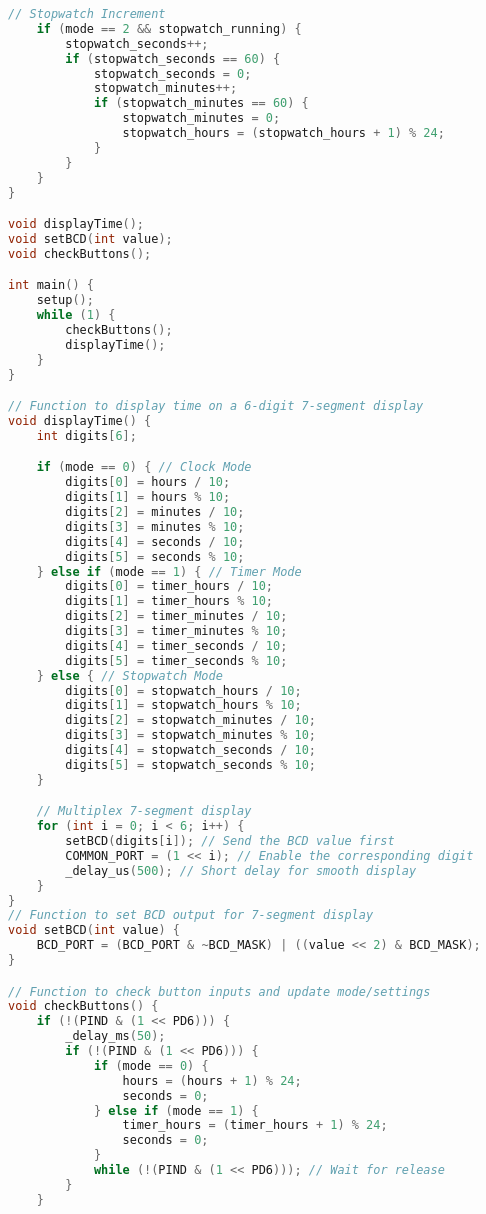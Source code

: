 \documentclass[a4paper,12pt]{article}
\begin{document}
\begin{lstlisting}[language=C++, caption=Arduino Code for Digital Clock]
    // Stopwatch Increment
    if (mode == 2 && stopwatch_running) {
        stopwatch_seconds++;
        if (stopwatch_seconds == 60) {
            stopwatch_seconds = 0;
            stopwatch_minutes++;
            if (stopwatch_minutes == 60) {
                stopwatch_minutes = 0;
                stopwatch_hours = (stopwatch_hours + 1) % 24;
            }
        }
    }
}

void displayTime();
void setBCD(int value);
void checkButtons();

int main() {
    setup();
    while (1) {
        checkButtons();
        displayTime();
    }
}

// Function to display time on a 6-digit 7-segment display
void displayTime() {
    int digits[6];

    if (mode == 0) { // Clock Mode
        digits[0] = hours / 10;
        digits[1] = hours % 10;
        digits[2] = minutes / 10;
        digits[3] = minutes % 10;
        digits[4] = seconds / 10;
        digits[5] = seconds % 10;
    } else if (mode == 1) { // Timer Mode
        digits[0] = timer_hours / 10;
        digits[1] = timer_hours % 10;
        digits[2] = timer_minutes / 10;
        digits[3] = timer_minutes % 10;
        digits[4] = timer_seconds / 10;
        digits[5] = timer_seconds % 10;
    } else { // Stopwatch Mode
        digits[0] = stopwatch_hours / 10;
        digits[1] = stopwatch_hours % 10;
        digits[2] = stopwatch_minutes / 10;
        digits[3] = stopwatch_minutes % 10;
        digits[4] = stopwatch_seconds / 10;
        digits[5] = stopwatch_seconds % 10;
    }

    // Multiplex 7-segment display
    for (int i = 0; i < 6; i++) {
        setBCD(digits[i]); // Send the BCD value first
        COMMON_PORT = (1 << i); // Enable the corresponding digit
        _delay_us(500); // Short delay for smooth display
    }
}
// Function to set BCD output for 7-segment display
void setBCD(int value) {
    BCD_PORT = (BCD_PORT & ~BCD_MASK) | ((value << 2) & BCD_MASK);
}

// Function to check button inputs and update mode/settings
void checkButtons() {
    if (!(PIND & (1 << PD6))) {
        _delay_ms(50);
        if (!(PIND & (1 << PD6))) {
            if (mode == 0) {
                hours = (hours + 1) % 24;
                seconds = 0;
            } else if (mode == 1) {
                timer_hours = (timer_hours + 1) % 24;
                seconds = 0;
            }
            while (!(PIND & (1 << PD6))); // Wait for release
        }
    }


\end{lstlisting}
\end{document}
